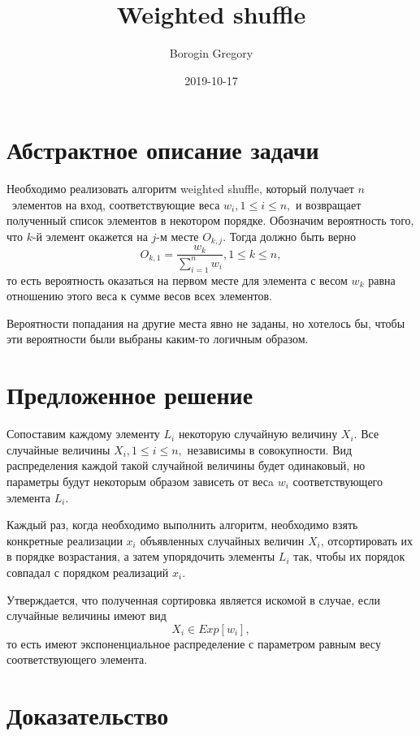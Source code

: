 \documentclass{article}
\title{Weighted shuffle}
\date{2019-10-17}
\author{Borogin Gregory}
\begin{document}
    \maketitle
    \newpage

    \section{Абстрактное описание задачи}

    Необходимо реализовать алгоритм weighted shuffle, который получает $n$~элементов на вход,
    соответствующие веса $w_i, 1\leq{}i\leq{}n,$ и возвращает полученный список элементов в некотором порядке.
    Обозначим вероятность того, что $k$-й элемент окажется на $j$-м месте $O_{k,j}$. Тогда должно быть верно
    $$O_{k,1}=\frac{w_k}{\sum_{i=1}^{n} w_i},1\leq{}k\leq{}n,$$
    то есть вероятность оказаться на первом месте для элемента с весом $w_k$ равна отношению этого веса
    к сумме весов всех элементов.

    Вероятности попадания на другие места явно не заданы, но хотелось бы, чтобы эти вероятности были
    выбраны каким-то логичным образом.

    \section{Предложенное решение}

    Сопоставим каждому элементу $L_i$ некоторую случайную величину $X_i$.
    Все случайные величины $X_i, 1\leq{}i\leq{}n,$ независимы в совокупности.
    Вид распределения каждой такой случайной величины будет одинаковый,
    но параметры будут некоторым образом зависеть от весa $w_i$ соответствующего элемента $L_i$.

    Каждый раз, когда необходимо выполнить алгоритм, необходимо взять конкретные реализации $x_i$
    объявленных случайных величин $X_i$, отсортировать их в порядке возрастания,
    а затем упорядочить элементы $L_i$ так, чтобы их порядок совпадал с порядком реализаций $x_i$.

    Утверждается, что полученная сортировка является искомой в случае, если случайные величины имеют вид
    $$X_i\in{}Exp[w_i],$$
    то есть имеют экспоненциальное распределение с параметром равным весу соответствующего элемента.

    \section{Доказательство}
\end{document}
